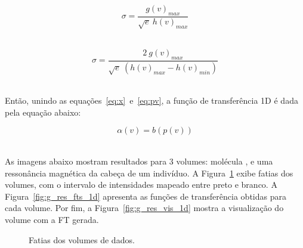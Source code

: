 \begin{equation} \label{eq:sigmav}
	\sigma = \frac{g(v)_{max}}{\sqrt{e}\ h(v)_{max}}
\end{equation} \

\begin{equation} \label{eq:sigmav2}
	\sigma = \frac{2\ g(v)_{max}}{\sqrt{e}\ (h(v)_{max} - h(v)_{min})}
\end{equation} \

	Então, unindo as equações~\eqref{eq:x}~e~\eqref{eq:pv}, a função de transferência 1D é dada pela equação abaixo:
	
\begin{equation} \label{eq:alpha}
	\alpha(v) = b(p(v))
\end{equation} \

	As imagens abaixo mostram resultados para 3 volumes: molécula ,  e uma ressonância magnética da cabeça de um indivíduo. A Figura~\ref{fig:g_res_slices_1d} exibe fatias dos volumes, com o intervalo de intensidades mapeado entre preto e branco. A Figura~\ref{fig:g_res_fts_1d} apresenta as funções de transferência obtidas para cada volume. Por fim, a Figura~\ref{fig:g_res_vis_1d} mostra a visualização do volume com a FT gerada.
	
\begin{figure}[h]
	\centering
	\caption{Fatias dos volumes de dados.}
	\label{fig:g_res_slices_1d}
\end{figure}

